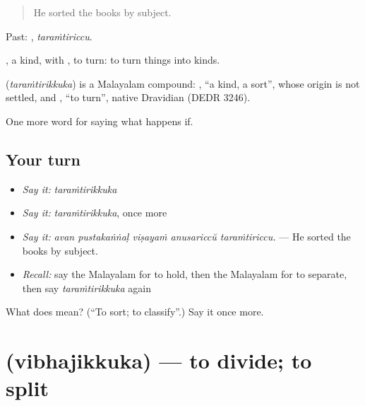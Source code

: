 \begin{quote}
He sorted the books by subject.
\end{quote}

Past: , \emph{taraṁtiriccu}.

, a kind, with , to turn: to turn things into kinds.

\begin{cousinweb}
\textbf{} (\emph{taraṁtirikkuka}) is a Malayalam compound: , \textquotedblleft{}a kind, a sort\textquotedblright{}, whose origin is not settled, and , \textquotedblleft{}to turn\textquotedblright{}, native Dravidian (DEDR 3246).
\end{cousinweb}

\begin{grammarlens}[title={What you've built}]
One more word for saying what happens if.
\end{grammarlens}

\subsection*{Your turn}
\begin{itemize}
\raggedright
  \item \emph{Say it:} \emph{taraṁtirikkuka}
  \item \emph{Say it:} \emph{taraṁtirikkuka}, once more
  \item \emph{Say it:} \emph{avan pustakaṅṅaḷ viṣayaṁ anusariccŭ taraṁtiriccu.} — He sorted the books by subject.
  \item \emph{Recall:} say the Malayalam for to hold, then the Malayalam for to separate, then say \emph{taraṁtirikkuka} again
\end{itemize}

\begin{tcolorbox}[breakable,colback=teal!4,colframe=teal!35!black,title={Before you move on}]
What does  mean? (\textquotedblleft{}To sort; to classify\textquotedblright{}.) Say it once more.
\end{tcolorbox}
\section[\texorpdfstring{\ml{വിഭജിക്കുക} (vibhajikkuka)}{വിഭജിക്കുക (vibhajikkuka)}]{ (vibhajikkuka) — to divide; to split}

\label{lesson:ML-C456-vibhajikkuka}




